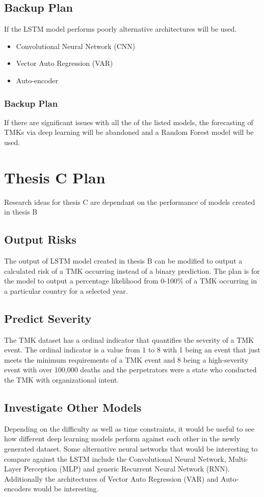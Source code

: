 \subsection{Backup Plan}
If the LSTM model performs poorly alternative architectures will be used. 
\begin{itemize}
  \item Convolutional Neural Network (CNN)
  \item Vector Auto Regression (VAR)
  \item Auto-encoder
\end{itemize}
\subsubsection{Backup Plan}
If there are  significant issues with all the of the listed models, the forecasting of TMKs via deep learning will be abandoned and a Random Forest model will be used.

\section{Thesis C Plan}
Research ideas for thesis C are dependant on the performance of models created in thesis B
\subsection{Output Risks}
The output of LSTM model created in thesis B can be modified to output a calculated risk of a TMK occurring instead of a binary prediction. The plan is for the model to output a percentage likelihood from 0-100\% of a TMK occurring in a particular country for a selected year.

\subsection{Predict Severity}
The TMK dataset has a ordinal indicator that quantifies the severity of a TMK event. The ordinal indicator is a value from 1 to 8 with 1 being an event that just meets the minimum requirements of a TMK event and 8 being a high-severity event with over 100,000 deaths and the perpetrators were a state who conducted the TMK with organizational intent.

\subsection{Investigate Other Models}
Depending on the difficulty as well as time constraints, it would be useful to see how different deep learning models perform against each other in the newly generated dataset. Some alternative neural networks that would be interesting to compare against the LSTM include the Convolutional Neural Network, Multi-Layer Perception (MLP) and generic Recurrent Neural Network (RNN). Additionally the architectures of Vector Auto Regression (VAR) and Auto-encoders would be interesting.

